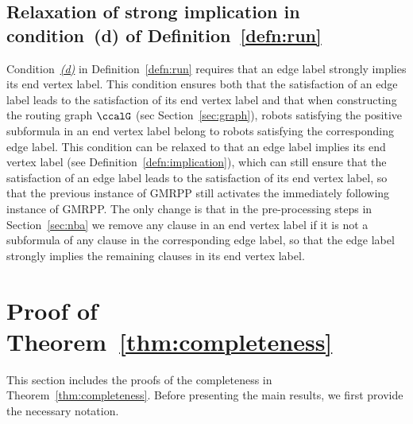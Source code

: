 \documentclass[Afour,sageh,times]{sagej}
\newcommand{\auto}[1]{\ccalA_{\textup{#1}}}
\begin{document}
{{\subsection{Relaxation of strong implication in condition~(d) of Definition~\ref{defn:run}}\label{sec:discussion}
 Condition~\hyperref[cond:d]{\it(d)} in Definition~\ref{defn:run} requires that an edge label strongly implies its end vertex label. This condition ensures  both that the satisfaction of an edge label leads to the satisfaction of its end vertex label and that when constructing the routing graph $\ccalG$ (sec Section~\ref{sec:graph}), robots satisfying the  positive subformula in an end vertex label belong to robots satisfying the corresponding edge label. This condition can be relaxed to that an edge label implies its end vertex label (see Definition~\ref{defn:implication}), which can still ensure that the satisfaction of an edge label leads to  the satisfaction of its end vertex label, so that the previous instance of GMRPP still activates the immediately following instance of GMRPP. The only change is that in the pre-processing steps in Section~\ref{sec:nba} we remove any clause in an end vertex label if it is not a subformula of any clause in the corresponding edge label, so that the edge label strongly implies the remaining clauses in its end vertex label.



 \section{Proof of Theorem~\ref{thm:completeness}}\label{app:correctness}
This section includes the proofs of the completeness in Theorem~\ref{thm:completeness}. Before presenting the main results, we first provide the necessary notation.
}}
\end{document}
